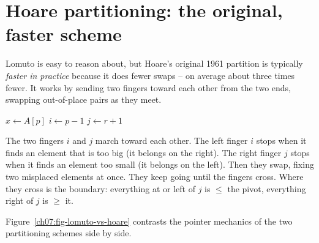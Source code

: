\section{Hoare partitioning: the original, faster scheme}

Lomuto is easy to reason about, but Hoare's original 1961 partition is
typically \emph{faster in practice} because it does fewer swaps -- on average
about three times fewer. It works by sending two fingers toward each other from
the two ends, swapping out-of-place pairs as they meet.

\begin{algorithm}[H]
\caption{\textsc{Hoare-Partition}($A, p, r$)}
$x \leftarrow A[p]$ 
$i \leftarrow p - 1$\;
$j \leftarrow r + 1$\;
\end{algorithm}

\begin{intuitionbox}
The two fingers $i$ and $j$ march toward each other. The left finger $i$ stops
when it finds an element that is too big (it belongs on the right). The right
finger $j$ stops when it finds an element too small (it belongs on the left).
Then they swap, fixing two misplaced elements at once. They keep going until the
fingers cross. Where they cross is the boundary: everything at or left of $j$ is
$\le$ the pivot, everything right of $j$ is $\ge$ it.
\end{intuitionbox}

Figure~\ref{ch07:fig-lomuto-vs-hoare} contrasts the pointer mechanics of the two
partitioning schemes side by side.

